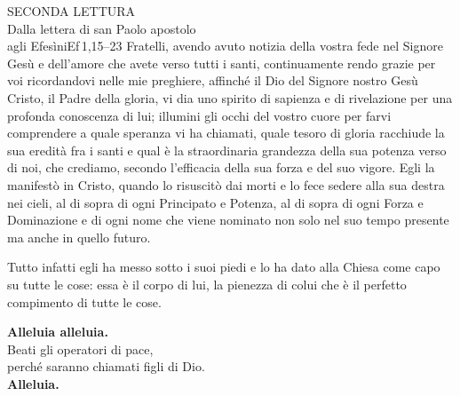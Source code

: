 \documentclass[11pt]{book}
\begin{document}
\begin{lettura}{SECONDA LETTURA\\Dalla lettera di san Paolo apostolo\\agli Efesìni}{Ef\,1,15--23}
Fratelli, avendo avuto notizia della vostra fede nel Signore Gesù e dell'amore che avete
verso tutti i santi, continuamente rendo grazie per voi ricordandovi nelle mie preghiere,
affinché il Dio del Signore nostro Gesù Cristo, il Padre della gloria, vi dia uno spirito
di sapienza e di rivelazione per una profonda conoscenza di lui; illumini gli occhi del
vostro cuore per farvi comprendere a quale speranza vi ha chiamati, quale tesoro di gloria
racchiude la sua eredità fra i santi e qual è la straordinaria grandezza della sua potenza
verso di noi, che crediamo, secondo l'efficacia della sua forza e del suo vigore. Egli la
manifestò in Cristo, quando lo risuscitò dai morti e lo fece sedere alla sua destra nei
cieli, al di sopra di ogni Principato e Potenza, al di sopra di ogni Forza e Dominazione
e di ogni nome che viene nominato non solo nel suo tempo presente ma anche in quello futuro.

Tutto infatti egli ha messo sotto i suoi piedi e lo ha dato alla Chiesa come capo su tutte
le cose: essa è il corpo di lui, la pienezza di colui che è il perfetto compimento di tutte
le cose.
\end{lettura}

\settowidth{\versewidth}{Beati gli operatori di pace,}
\begin{canzone}%
\textbf{Alleluia alleluia.}\\
Beati gli operatori di pace,\\
perché saranno chiamati figli di Dio.\\
\textbf{Alleluia.}
\end{canzone}

\newpage
\end{document}
